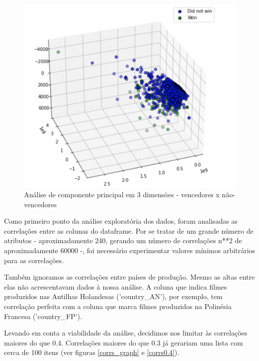             \begin{figure}[htb]
            	\caption{\label{pca_3}Análise de componente principal em 3 dimensões - vencedores x não-vencedores}
            	\begin{center}
            		\includegraphics[scale=0.7]{pca_3.png}
            	\end{center}
            \end{figure}

            Como primeiro ponto da análise exploratória dos dados, foram analisadas as correlações entre as colunas do dataframe. Por se tratar de um grande número de atributos - aproximadamente 240, gerando um número de correlações n**2 de aproximadamente 60000 -, foi necessário experimentar valores mínimos arbitrários para as correlações.

            Também ignoramos as correlações entre países de produção. Mesmo as altas entre elas não acrescentavam dados à nossa análise. A coluna que indica filmes produzidos nas Antilhas Holandesas ('country\_AN'), por exemplo, tem correlação perfeita com a coluna que marca filmes produzidos na Polinésia Francesa ('country\_FP').\par

            Levando em conta a viabilidade da análise, decidimos nos limitar às correlações maiores do que 0.4. Correlações maiores do que 0.3 já gerariam uma lista com cerca de 100 itens (ver figuras \ref{corrs_graph} e \ref{corrs0.4}). \par

